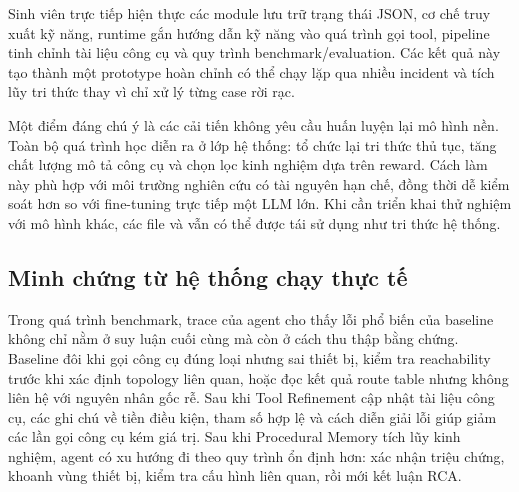 Sinh viên trực tiếp hiện thực các module lưu trữ trạng thái JSON, cơ chế truy xuất kỹ năng, runtime gắn hướng dẫn kỹ năng vào quá trình gọi tool, pipeline tinh chỉnh tài liệu công cụ và quy trình benchmark/evaluation. Các kết quả này tạo thành một prototype hoàn chỉnh có thể chạy lặp qua nhiều incident và tích lũy tri thức thay vì chỉ xử lý từng case rời rạc.

Một điểm đáng chú ý là các cải tiến không yêu cầu huấn luyện lại mô hình nền. Toàn bộ quá trình học diễn ra ở lớp hệ thống: tổ chức lại tri thức thủ tục, tăng chất lượng mô tả công cụ và chọn lọc kinh nghiệm dựa trên reward. Cách làm này phù hợp với môi trường nghiên cứu có tài nguyên hạn chế, đồng thời dễ kiểm soát hơn so với fine-tuning trực tiếp một LLM lớn. Khi cần triển khai thử nghiệm với mô hình khác, các file  và  vẫn có thể được tái sử dụng như tri thức hệ thống.

\subsection{Minh chứng từ hệ thống chạy thực tế}

Trong quá trình benchmark, trace của agent cho thấy lỗi phổ biến của baseline không chỉ nằm ở suy luận cuối cùng mà còn ở cách thu thập bằng chứng. Baseline đôi khi gọi công cụ đúng loại nhưng sai thiết bị, kiểm tra reachability trước khi xác định topology liên quan, hoặc đọc kết quả route table nhưng không liên hệ với nguyên nhân gốc rễ. Sau khi Tool Refinement cập nhật tài liệu công cụ, các ghi chú về tiền điều kiện, tham số hợp lệ và cách diễn giải lỗi giúp giảm các lần gọi công cụ kém giá trị. Sau khi Procedural Memory tích lũy kinh nghiệm, agent có xu hướng đi theo quy trình ổn định hơn: xác nhận triệu chứng, khoanh vùng thiết bị, kiểm tra cấu hình liên quan, rồi mới kết luận RCA.
